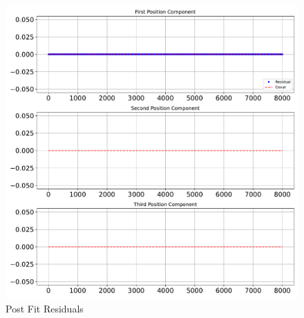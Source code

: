 \begin{figure}[htbp]\centerline{\includegraphics[height=0.9\textwidth, keepaspectratio]{AutoTeX/PostFitProp}}\caption{Post Fit Residuals}\label{fig:PostFitProp}\end{figure}